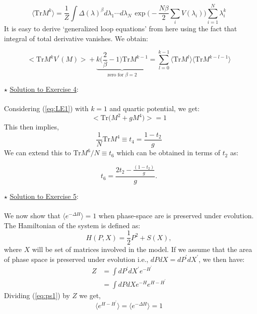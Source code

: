 \documentclass[letter,11pt]{article}
\begin{document}
\begin{equation} 
\langle \mbox{Tr} M^k  \rangle = \frac{1}{Z} \int \Delta(\lambda)^{\beta} 
	d\lambda_1 \cdots d\lambda_{N~} \exp\Bigg(-\frac{N\beta}{2} \sum_{i} V(\lambda_{i})\Bigg)  \sum_{i=1}^{N} \lambda_{i}^k
\end{equation}
It is easy to derive `generalized loop equations' from here using the fact that integral 
of total derivative vanishes. We obtain:

\begin{equation}
		\Big< \mathrm{Tr} M^{k} V^{\prime}(M) \Big> +  \underbrace{k \Bigg(\frac{2}{\beta} - 1 \Bigg) \mathrm{Tr} M^{k-1}}_{\text{zero for $\beta=2$}} = \sum_{l=0}^{k-1} \langle \mathrm{Tr} M^{l} \rangle  \langle \mathrm{Tr} M^{k-l-1} \rangle
\end{equation}
 
\noindent $\star$ \ul{Solution to Exercise 4}:
\\ \\ Considering (\ref{eq:LE1}) with $k=1$ and quartic potential, we get: 
    \begin{equation}
    \Big< \mathrm{Tr}\Big(M^{2} + g M^{4}\Big) \Big> = 1 
    \end{equation}
    This then implies, 
     \begin{equation}
     \frac{1}{N} \mathrm{Tr} M^{4} \equiv t_{4} =  \frac{1 - t_2}{g} 
     \end{equation}
     We can extend this to $\mathrm{Tr} M^{6}/N \equiv t_{6}$ which can be obtained in terms of 
     $t_2$ as:  
     
     \begin{equation}
     	t_{6} = \frac{2t_{2} - \frac{(1-t_{2})}{g}}{g}. 
     \end{equation} 

\noindent $\star$ \ul{Solution to Exercise 5}:
\\ \\ We now show that $ \langle e^{-\Delta H} \rangle = 1$ when phase-space are is preserved under evolution. The Hamiltonian of the system is defined as:
\begin{equation}
	H(P,X) = \frac{1}{2}P^2  + S(X), 
\end{equation} 
where $X$ will be set of matrices involved in the model. If we assume that the area of phase space is preserved under evolution i.e., $dP dX = dP^{\prime} dX^{\prime}$, we then have:
\begin{align}
	\label{eq:ps1} 
	Z &= \int dP^{\prime} dX^{\prime} e^{-H^{\prime} \nonumber }  \\
	&=  \int dP dX e^{-H} e^{H-H^{\prime}}
\end{align}
Dividing (\ref{eq:ps1}) by $Z$ we get, 
\begin{equation}
	\langle e^{H-H^{\prime}} \rangle = 	\langle e^{-\Delta H} \rangle = 1
\end{equation}
\end{document}
